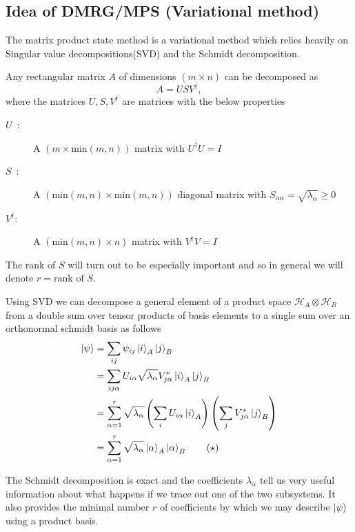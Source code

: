 \documentclass[a4paper]{article}
\begin{document}
\subsection{Idea of DMRG/MPS (Variational method)}
The matrix product state method is a variational method which relies heavily on
Singular value decompositions(SVD) and the Schmidt decomposition.
\begin{method}
    Any rectangular matrix $A$ of dimensions $(m\times n)$ can be decomposed as 
\[
A=USV^\dagger,
\]
where the matrices $U,S,V^\dagger$ are matrices with the below properties
\begin{description}
    \item[$U\,\,\,$:] A $\left(m\times\mathrm{min}(m,n)\right)$ matrix with $U^\dagger U=I$
    \item[$S\,\,\,$:] A $\left(\mathrm{min}(m,n)\times\mathrm{min}(m,n)\right)$ diagonal matrix with
            $S_{\alpha\alpha}=\sqrt{\lambda_\alpha}\geq0$
    \item[$V^\dagger$:] A $\left(\mathrm{min}(m,n)\times n\right)$ matrix with $V^\dagger V=I$
\end{description}
The rank of $S$ will turn out to be especially important and so in general we
will denote $r=\text{rank of $S$}$.
\end{method}
\begin{method}
    Using SVD we can decompose a general element of a product space
    $\mathcal{H}_A\otimes \mathcal{H}_B$ from a double sum over tensor products
    of basis elements to a single sum over an orthonormal schmidt basis as follows
\begin{align*}
\ket{\psi}&=\sum_{ij}\psi_{ij}\ket{i}_A\ket{j}_B\\
&= \sum_{ij\alpha}U_{i\alpha}\sqrt{\lambda_\alpha} V_{j\alpha}^*\ket{i}_A\ket{j}_B\\
&=\sum_{\alpha=1}^r \sqrt{\lambda_\alpha}\left(\sum_i U_{i\alpha}\ket{i}_A\right)\left(\sum_j
V_{j\alpha}^* \ket{j}_B\right)\\
&=\sum_{\alpha=1}^{r}\sqrt{\lambda_\alpha}\ket{\alpha}_A\ket{\alpha}_B\tag{$\star$}\label{eq:schmidtdecomp}
\end{align*}
\end{method}
The Schmidt decomposition is exact and the coefficients $\lambda_\alpha$ tell us very useful
information about what happens if we trace out one of the two subsystems. It
also provides the minimal number $r$ of coefficients by which we may describe
$\ket{\psi}$ using a product basis. 
\end{document}
